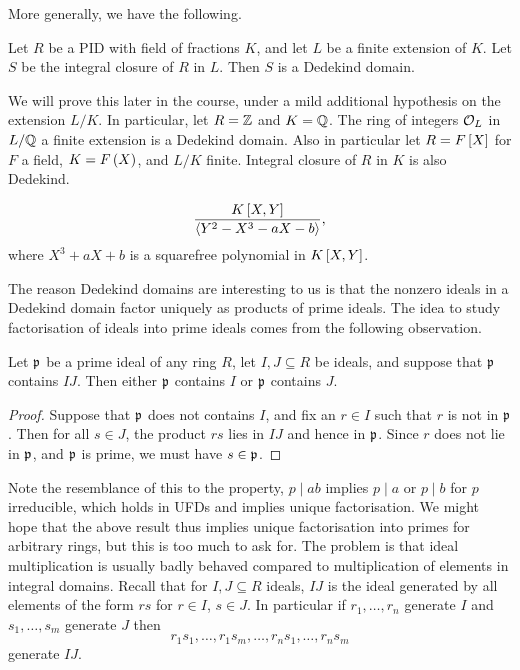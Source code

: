 More generally, we have the following.

\begin{theorem}
Let $ R $ be a PID with field of fractions $ K $, and let $ L $ be a finite extension of $ K $. Let $ S $ be the integral closure of $ R $ in $ L $. Then $ S $ is a Dedekind domain.
\end{theorem}

We will prove this later in the course, under a mild additional hypothesis on the extension $ L / K $. In particular, let $ R = \Z $ and $ K = \Q $. The ring of integers $ \OO_L $ in $ L / \Q $ a finite extension is a Dedekind domain. Also in particular let $ R = F\sb{X} $ for $ F $ a field, $ K = F\rb{X} $, and $ L / K $ finite. Integral closure of $ R $ in $ K $ is also Dedekind.

\begin{example*}
$$ \dfrac{K\sb{X, Y}}{\ab{Y^2 - X^3 - aX - b}}, $$
where $ X^3 + aX + b $ is a squarefree polynomial in $ K\sb{X, Y} $.
\end{example*}

The reason Dedekind domains are interesting to us is that the nonzero ideals in a Dedekind domain factor uniquely as products of prime ideals. The idea to study factorisation of ideals into prime ideals comes from the following observation.

\begin{lemma}
\label{lem:11.1.3}
Let $ \pp $ be a prime ideal of any ring $ R $, let $ I, J \subseteq R $ be ideals, and suppose that $ \pp $ contains $ IJ $. Then either $ \pp $ contains $ I $ or $ \pp $ contains $ J $.
\end{lemma}

\begin{proof}
Suppose that $ \pp $ does not contains $ I $, and fix an $ r \in I $ such that $ r $ is not in $ \pp $. Then for all $ s \in J $, the product $ rs $ lies in $ IJ $ and hence in $ \pp $. Since $ r $ does not lie in $ \pp $, and $ \pp $ is prime, we must have $ s \in \pp $.
\end{proof}

\pagebreak

Note the resemblance of this to the property, $ p \mid ab $ implies $ p \mid a $ or $ p \mid b $ for $ p $ irreducible, which holds in UFDs and implies unique factorisation. We might hope that the above result thus implies unique factorisation into primes for arbitrary rings, but this is too much to ask for. The problem is that ideal multiplication is usually badly behaved compared to multiplication of elements in integral domains. Recall that for $ I, J \subseteq R $ ideals, $ IJ $ is the ideal generated by all elements of the form $ rs $ for $ r \in I $, $ s \in J $. In particular if $ r_1, \dots, r_n $ generate $ I $ and $ s_1, \dots, s_m $ generate $ J $ then
$$ r_1s_1, \dots, r_1s_m, \dots, r_ns_1, \dots, r_ns_m $$
generate $ IJ $.

